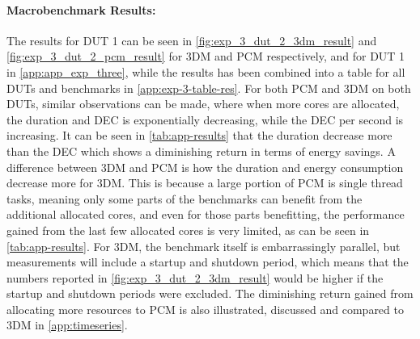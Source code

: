 


\paragraph*{Macrobenchmark Results:} The results for DUT 1 can be seen in \cref{fig:exp_3_dut_2_3dm_result} and \cref{fig:exp_3_dut_2_pcm_result} for 3DM and PCM respectively, and for DUT 1 in \cref{app:app_exp_three}, while the results has been combined into a table for all DUTs and benchmarks in \cref{app:exp-3-table-res}. For both PCM and 3DM on both DUTs, similar observations can be made, where when more cores are allocated, the duration and DEC is exponentially decreasing, while the DEC per second is increasing. It can be seen in \cref{tab:app-results} that the duration decrease more than the DEC which shows a diminishing return in terms of energy savings. A difference between 3DM and PCM is how the duration and energy consumption decrease more for 3DM. This is because a large portion of PCM is single thread tasks, meaning only some parts of the benchmarks can benefit from the additional allocated cores, and even for those parts benefitting, the performance gained from the last few allocated cores is very limited, as can be seen in \cref{tab:app-results}.  For 3DM, the benchmark itself is embarrassingly parallel, but measurements will include a startup and shutdown period, which means that the numbers reported in \cref{fig:exp_3_dut_2_3dm_result} would be higher if the startup and shutdown periods were excluded. The diminishing return gained from allocating more resources to PCM is also illustrated, discussed and compared to 3DM in \cref{app:timeseries}.


